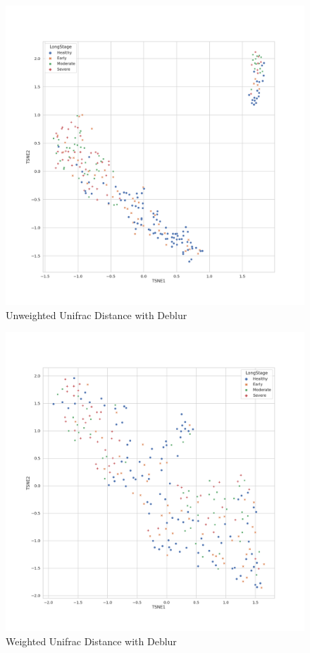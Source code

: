 \documentclass{beamer}
\begin{document}
\begin{frame}[allowframebreaks]
        \begin{figure}
            \includegraphics[width=0.5 \linewidth]{figures/BetaDiversity/Deblur.unweighted_unifrac.png}
            \caption{Unweighted Unifrac Distance with Deblur}
        \end{figure}

        \begin{figure}
            \includegraphics[width=0.5 \linewidth]{figures/BetaDiversity/Deblur.weighted_unifrac.png}
            \caption{Weighted Unifrac Distance with Deblur}
        \end{figure}
    \end{frame}
\end{document}
